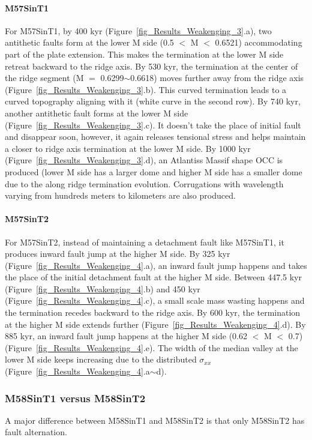 \documentclass[draft,gc]{agutex}
\begin{document}
\begin{article}
\paragraph{M57SinT1}\label{para_M57SinT1}
For M57SinT1, by 400 kyr (Figure~\ref{fig_Results_Weakenging_3}.a), two antithetic faults form at the lower M side (0.5 $<$ M $<$ 0.6521) accommodating part of the plate extension. This makes the termination at the lower M side retreat backward to the ridge axis. By 530 kyr, the termination at the center of the ridge segment (M $=$ 0.6299$\sim$0.6618) moves further away from the ridge axis (Figure~\ref{fig_Results_Weakenging_3}.b). This curved termination leads to a curved topography aligning with it (white curve in the second row). By 740 kyr, another antithetic fault forms at the lower M side (Figure~\ref{fig_Results_Weakenging_3}.c). It doesn't take the place of initial fault and disappear soon, however, it again releases tensional stress and helps maintain a closer to ridge axis termination at the lower M side. By 1000 kyr (Figure~\ref{fig_Results_Weakenging_3}.d), an Atlantiss Massif shape OCC is produced (lower M side has a larger dome and higher M side has a smaller dome due to the along ridge termination evolution. Corrugations with wavelength varying from hundreds meters to kilometers are also produced.

\paragraph{M57SinT2}\label{para_M57SinT2}
For M57SinT2, instead of maintaining a detachment fault like M57SinT1, it produces inward fault jump at the higher M side. By 325 kyr (Figure~\ref{fig_Results_Weakenging_4}.a), an inward fault jump happens and takes the place of the initial detachment fault at the higher M side. Between 447.5 kyr (Figure~\ref{fig_Results_Weakenging_4}.b) and 450 kyr (Figure~\ref{fig_Results_Weakenging_4}.c), a small scale mass wasting happens and the termination recedes backward to the ridge axis. By 600 kyr, the termination at the higher M side extends further (Figure~\ref{fig_Results_Weakenging_4}.d). By 885 kyr, an inward fault jump happens at the higher M side (0.62 $<$ M $<$ 0.7) (Figure~\ref{fig_Results_Weakenging_4}.e). The width of the median valley at the lower M side keeps increasing due to the distributed $\sigma_{xx}$ (Figure~\ref{fig_Results_Weakenging_4}.a$\sim$d).

\subsubsection{M58SinT1 versus M58SinT2}
A major difference between M58SinT1 and M58SinT2 is that only M58SinT2 has fault alternation.

\end{article}
\end{document}
